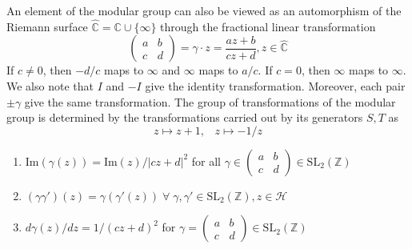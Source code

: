 \documentclass[oneside, 12pt]{scrbook}
\newcommand{\CC}{\mathbb C}
\newcommand{\ZZ}{\mathbb Z}
\newcommand{\SL}{\mathrm{SL}}
\newcommand{\iM}{\mathrm{Im}}
\newcommand{\Hh}{\mathcal{H}}
\theoremstyle{theorem}
\begin{document}
An element of the modular group can also be viewed as an automorphism of the Riemann surface $\widehat{\CC} =\CC \cup \{\infty\}$ through the fractional linear transformation 
\begin{equation}
\begin{pmatrix}
a & b \\ c & d
\end{pmatrix} = \gamma \cdot z = \frac{az+b}{cz+d} , z\in \widehat{\CC}
\end{equation}
If $c\neq 0$, then $-d/c$ maps to $\infty$ and $\infty$ maps to $a/c$. If $c=0$, then $\infty$ maps to $\infty$. \\

We also note that $I$ and $-I$ give the identity transformation. Moreover, each pair $\pm \gamma$ give the same transformation. The group of transformations of the modular group is determined by the transformations carried out by its generators $S,T$ as $$ z \mapsto z + 1, \;\;\; z \mapsto -1/z$$

\begin{proposition}[DS, Exercise 1.1.2]
\begin{enumerate}
\item $\iM(\gamma(z)) = \iM(z)/|cz+d|^2$ for all $\gamma \in \begin{pmatrix}
a & b \\ c & d
\end{pmatrix} \in \SL_{2}(\ZZ)$
\item $(\gamma \gamma')(z) = \gamma(\gamma'(z)) \; \forall \; \gamma , \gamma' \in \SL_{2}(\ZZ), z \in \Hh$
\item $d\gamma(z)/dz = 1/(cz+d)^2$ for $\gamma = \begin{pmatrix}
a & b \\ c & d
\end{pmatrix} \in \SL_{2}(\ZZ)$
\end{enumerate}
\end{proposition}
\end{document}
